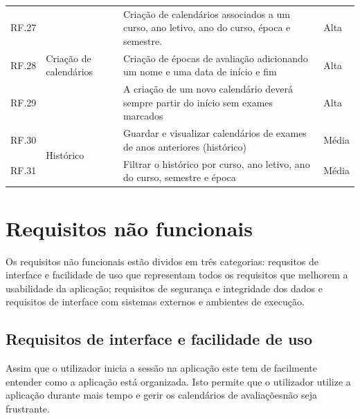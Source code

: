 \documentclass[11pt, twoside]{report}
\begin{document}
\begin{center}
\begin{longtable}{|m{1cm}|m{2.2cm}|m{10cm}|m{2cm}|}
			RF.27 &\multirow{3}{2cm}{Criação de calendários}&Criação de calendários associados a um curso, ano letivo, ano do curso, época e semestre.& Alta \\
			
			RF.28 && Criação de épocas de avaliação adicionando um nome e uma data de início e fim & Alta \\
			
			RF.29 && A criação de um novo calendário deverá sempre partir do início sem exames marcados & Alta\\
			\hline
			RF.30 &\multirow{2}{*}{Histórico}& Guardar e visualizar calendários de exames de anos anteriores (histórico)& Média \\
			
			RF.31 && Filtrar o histórico por curso, ano letivo, ano do curso, semestre e época& Média \\
			\hline
		\end{longtable}
	\end{center}



	
	\section{Requisitos não funcionais}
	
	Os requisitos não funcionais estão dividos em três categorias: requsitos de interface e facilidade de uso que representam todos os requisitos que melhorem a usabilidade da aplicação; requisitos de segurança e integridade dos dados e requisitos de interface com sistemas externos e ambientes de execução.
	
	\subsection{Requisitos de interface e facilidade de uso}

Assim que o utilizador inicia a sessão na aplicação este tem de facilmente entender como a aplicação está organizada. Isto permite que o utilizador utilize a aplicação durante mais tempo e gerir os calendários de avaliaçõesnão seja frustrante.
	
\end{document}
